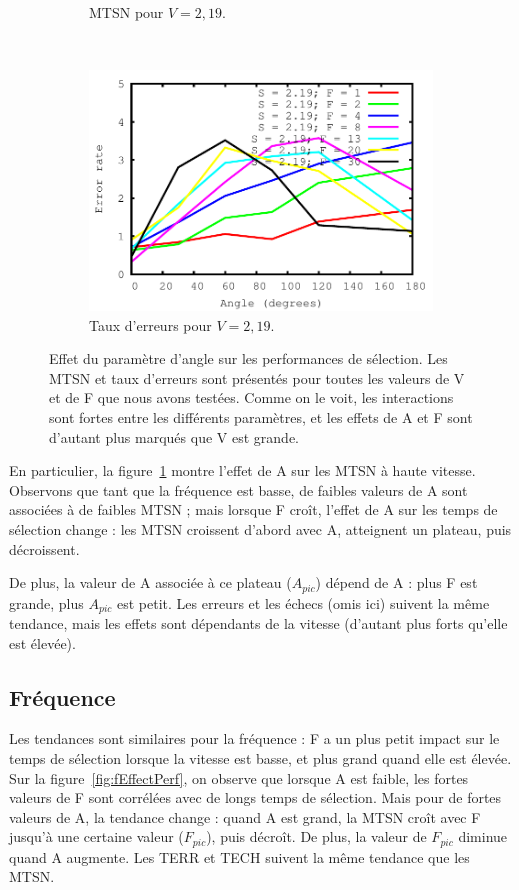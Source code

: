 \begin{figure}[!htb]
\begin{subfigure}[t]{\subImgWlineplot}
			\caption{MTSN pour $V = 2,19$.}
			\label{fig:aEffect_t_219}
		\end{subfigure}
		~
		\begin{subfigure}[t]{\subImgWlineplot}
			\centering
			\includegraphics[width=\textwidth]{figures/ch4/angle_speed_2_19_errors}
			\caption{Taux d'erreurs pour $V = 2,19$.}
			\label{fig:aEffect_e_219}
		\end{subfigure}
		\caption[Effet du paramètre d'angle sur les performances de sélection]{Effet du paramètre d'angle sur les performances de sélection. Les MTSN et taux d'erreurs sont présentés pour toutes les valeurs de V et de F que nous avons testées. Comme on le voit, les interactions sont fortes entre les différents paramètres, et les effets de A et F sont d'autant plus marqués que V est grande.}
		\label{fig:aEffectPerf}
	\end{figure}
	
	En particulier, la figure~\ref{fig:aEffect_t_219} montre l'effet de A sur les MTSN à haute vitesse. Observons que tant que la fréquence est basse, de faibles valeurs de A sont associées à de faibles MTSN ; mais lorsque F croît, l'effet de A sur les temps de sélection change : les MTSN croissent d'abord avec A, atteignent un plateau, puis décroissent.
	
	De plus, la valeur de A associée à ce plateau ($A_{pic}$) dépend de A : plus F est grande, plus $A_{pic}$ est petit. Les erreurs et les échecs (omis ici) suivent la même tendance, mais les effets sont dépendants de la vitesse (d'autant plus forts qu'elle est élevée).

	\subsection{Fréquence}
	Les tendances sont similaires pour la fréquence : F a un plus petit impact sur le temps de sélection lorsque la vitesse est basse, et plus grand quand elle est élevée. Sur la figure~\ref{fig:fEffectPerf}, on observe que lorsque A est faible, les fortes valeurs de F sont corrélées avec de longs temps de sélection. Mais pour de fortes valeurs de A, la tendance change : quand A est grand, la MTSN croît avec F jusqu'à une certaine valeur ($F_{pic}$), puis décroît. De plus, la valeur de $F_{pic}$ diminue quand A augmente. Les TERR et TECH suivent la même tendance que les MTSN.
	
